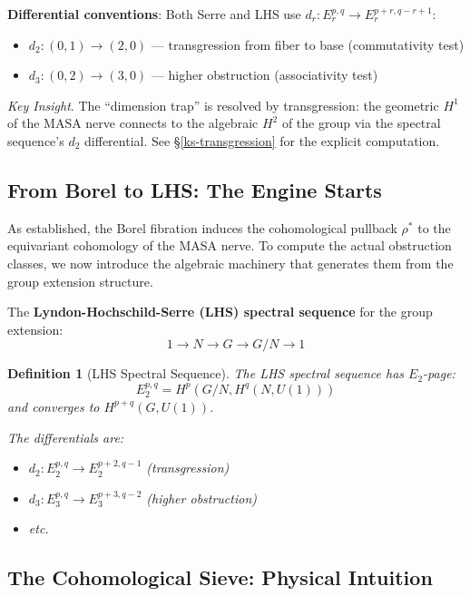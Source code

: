 \documentclass[11pt]{article}
\newtheorem{definition}[theorem]{Definition}
\begin{document}
\begin{table}[h]
\textbf{Differential conventions}: Both Serre and LHS use $d_r: E_r^{p,q} \to E_r^{p+r, q-r+1}$:
\begin{itemize}
\item $d_2: (0,1) \to (2,0)$ --- transgression from fiber to base (commutativity test)
\item $d_3: (0,2) \to (3,0)$ --- higher obstruction (associativity test)
\end{itemize}
\end{table}

\textit{Key Insight}.
The ``dimension trap'' is resolved by transgression: the geometric $H^1$ of the MASA nerve connects to the algebraic $H^2$ of the group via the spectral sequence's $d_2$ differential. See \S\ref{ks-transgression} for the explicit computation.

\subsection{From Borel to LHS: The Engine Starts}
\label{engine}

As established, the Borel fibration induces the cohomological pullback $\rho^*$ to the equivariant cohomology of the MASA nerve. To compute the actual obstruction classes, we now introduce the algebraic machinery that generates them from the group extension structure.

The \textbf{Lyndon-Hochschild-Serre (LHS) spectral sequence} for the group extension:
\[
1 \longrightarrow N \longrightarrow G \longrightarrow G/N \longrightarrow 1
\]

\begin{definition}[LHS Spectral Sequence]\label{def:lhs}
The LHS spectral sequence has $E_2$-page:
\[
E_2^{p,q} = H^p(G/N, H^q(N, U(1)))
\]
and converges to $H^{p+q}(G, U(1))$.

The differentials are:
\begin{itemize}
\item $d_2: E_2^{p,q} \to E_2^{p+2, q-1}$ (transgression)
\item $d_3: E_3^{p,q} \to E_3^{p+3, q-2}$ (higher obstruction)
\item etc.
\end{itemize}
\end{definition}

\subsection{The Cohomological Sieve: Physical Intuition}
\label{sieve}
\end{document}
